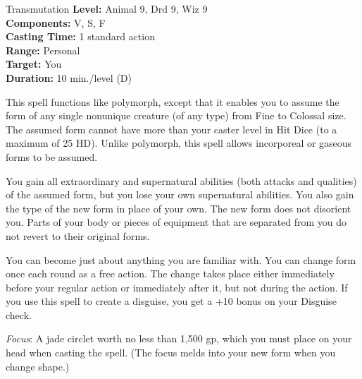 {Transmutation}
{
	\textbf{Level:}
	Animal 9, Drd 9, Wiz 9\\
	\textbf{Components:}
	V, S, F\\
	\textbf{Casting Time:}
	1 standard action\\
	\textbf{Range:}
	Personal\\
	\textbf{Target:}
	You\\
	\textbf{Duration:}
	10 min./level (D)\\
}
{
	This spell functions like polymorph, except that it enables you to assume the form of any single nonunique creature (of any type) from Fine to Colossal size. The assumed form cannot have more than your caster level in Hit Dice (to a maximum of 25 HD). Unlike polymorph, this spell allows incorporeal or gaseous forms to be assumed.

	You gain all extraordinary and supernatural abilities (both attacks and qualities) of the assumed form, but you lose your own supernatural abilities. You also gain the type of the new form in place of your own. The new form does not disorient you. Parts of your body or pieces of equipment that are separated from you do not revert to their original forms.

	You can become just about anything you are familiar with. You can change form once each round as a free action. The change takes place either immediately before your regular action or immediately after it, but not during the action. If you use this spell to create a disguise, you get a +10 bonus on your Disguise check.

	\textit{Focus}:
	A jade circlet worth no less than 1,500 gp, which you must place on your head when casting the spell. (The focus melds into your new form when you change shape.)

}
